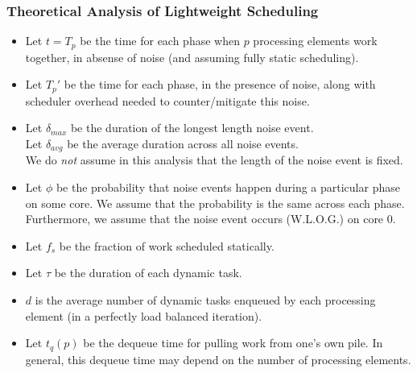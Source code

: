 \begin{frame}
\frametitle{Theoretical Analysis of Lightweight Scheduling}
\begin{itemize}
\item \tiny Let $t = T_p$ be the time for each phase when $p$ processing elements
work together, in absense of noise (and assuming fully static scheduling). \\
\item \tiny Let $T_{p}'$ be the time for each phase, in the presence of noise, along with scheduler overhead needed
to counter/mitigate this noise. \\
\item \tiny Let $\delta_{max}$ be the duration of the longest length noise event. \\
Let $\delta_{avg}$ be the average duration across all noise events.  \\
We do \textit{not} assume in this analysis that the length of the noise event is fixed. \\
\item \tiny Let $\phi$ be the probability that noise events happen during a
particular phase on some core. We assume that the probability is the same
across each phase. Furthermore, we assume that the noise event occurs 
(W.L.O.G.) on core 0. \\ 
\item \tiny Let $f_{s}$ be the fraction of work scheduled statically. \\
\item \tiny Let $\tau$ be the duration of each dynamic task. \\
\item \tiny $d$ is the average number of dynamic tasks enqueued by each
processing element (in a perfectly load balanced iteration). \\
\item \tiny Let ${t_q}(p)$ be the dequeue time for pulling work from one's
own pile. In general, this dequeue time may depend on the number of processing
elements. \\ 
\end{itemize}
\end{frame} 

